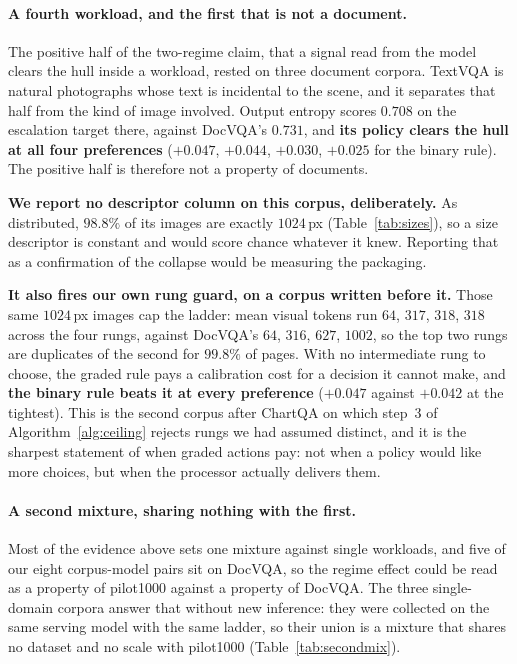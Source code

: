 \documentclass[10pt,twocolumn]{article}
\theoremstyle{plain}
\begin{document}
\paragraph{A fourth workload, and the first that is not a document.} The
positive half of the two-regime claim, that a signal read from the model clears
the hull inside a workload, rested on three document corpora. TextVQA is
natural photographs whose text is incidental to the scene, and it separates
that half from the kind of image involved. Output entropy scores $0.708$ on the
escalation target there, against DocVQA's $0.731$, and \textbf{its policy
clears the hull at all four preferences} ($+0.047$, $+0.044$, $+0.030$,
$+0.025$ for the binary rule). The positive half is therefore not a property of
documents.

\textbf{We report no descriptor column on this corpus, deliberately.} As
distributed, $98.8\%$ of its images are exactly $1024$\,px
(Table~\ref{tab:sizes}), so a size descriptor is constant and would score
chance whatever it knew. Reporting that as a confirmation of the collapse would
be measuring the packaging.

\textbf{It also fires our own rung guard, on a corpus written before it.} Those
same $1024$\,px images cap the ladder: mean visual tokens run $64$, $317$,
$318$, $318$ across the four rungs, against DocVQA's $64$, $316$, $627$,
$1002$, so the top two rungs are duplicates of the second for $99.8\%$ of
pages. With no intermediate rung to choose, the graded rule pays a calibration
cost for a decision it cannot make, and \textbf{the binary rule beats it at
every preference} ($+0.047$ against $+0.042$ at the tightest). This is the
second corpus after ChartQA on which step~3 of Algorithm~\ref{alg:ceiling}
rejects rungs we had assumed distinct, and it is the sharpest statement of when
graded actions pay: not when a policy would like more choices, but when the
processor actually delivers them.

\paragraph{A second mixture, sharing nothing with the first.} Most of the
evidence above sets one mixture against single workloads, and five of our eight
corpus-model pairs sit on DocVQA, so the regime effect could be read as a
property of pilot1000 against a property of DocVQA. The three single-domain
corpora answer that without new inference: they were collected on the same
serving model with the same ladder, so their union is a mixture that shares no
dataset and no scale with pilot1000 (Table~\ref{tab:secondmix}).
\end{document}
